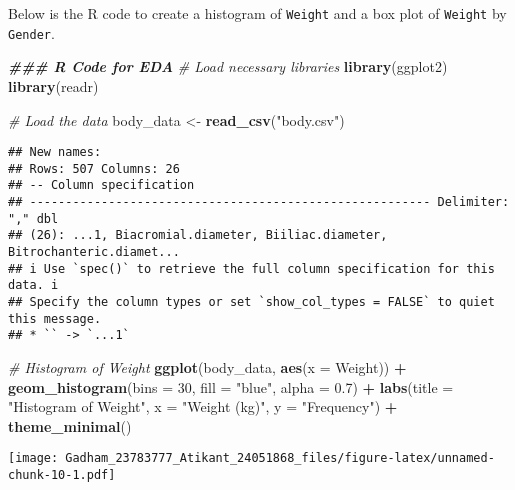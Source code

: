 \documentclass[
]{article}
\newenvironment{Shaded}{\begin{snugshade}}{\end{snugshade}}
\newcommand{\AttributeTok}[1]{\textcolor[rgb]{0.13,0.29,0.53}{#1}}
\newcommand{\CommentTok}[1]{\textcolor[rgb]{0.56,0.35,0.01}{\textit{#1}}}
\newcommand{\DecValTok}[1]{\textcolor[rgb]{0.00,0.00,0.81}{#1}}
\newcommand{\DocumentationTok}[1]{\textcolor[rgb]{0.56,0.35,0.01}{\textbf{\textit{#1}}}}
\newcommand{\FloatTok}[1]{\textcolor[rgb]{0.00,0.00,0.81}{#1}}
\newcommand{\FunctionTok}[1]{\textcolor[rgb]{0.13,0.29,0.53}{\textbf{#1}}}
\newcommand{\NormalTok}[1]{#1}
\newcommand{\OtherTok}[1]{\textcolor[rgb]{0.56,0.35,0.01}{#1}}
\newcommand{\SpecialCharTok}[1]{\textcolor[rgb]{0.81,0.36,0.00}{\textbf{#1}}}
\newcommand{\StringTok}[1]{\textcolor[rgb]{0.31,0.60,0.02}{#1}}
\begin{document}
Below is the R code to create a histogram of \texttt{Weight} and a box
plot of \texttt{Weight} by \texttt{Gender}.

\begin{Shaded}
\begin{Highlighting}[]
\DocumentationTok{\#\#\# R Code for EDA}
\CommentTok{\# Load necessary libraries}
\FunctionTok{library}\NormalTok{(ggplot2)}
\FunctionTok{library}\NormalTok{(readr)}

\CommentTok{\# Load the data}
\NormalTok{body\_data }\OtherTok{\textless{}{-}} \FunctionTok{read\_csv}\NormalTok{(}\StringTok{"body.csv"}\NormalTok{)}
\end{Highlighting}
\end{Shaded}

\begin{verbatim}
## New names:
## Rows: 507 Columns: 26
## -- Column specification
## -------------------------------------------------------- Delimiter: "," dbl
## (26): ...1, Biacromial.diameter, Biiliac.diameter, Bitrochanteric.diamet...
## i Use `spec()` to retrieve the full column specification for this data. i
## Specify the column types or set `show_col_types = FALSE` to quiet this message.
## * `` -> `...1`
\end{verbatim}

\begin{Shaded}
\begin{Highlighting}[]
\CommentTok{\# Histogram of Weight}
\FunctionTok{ggplot}\NormalTok{(body\_data, }\FunctionTok{aes}\NormalTok{(}\AttributeTok{x =}\NormalTok{ Weight)) }\SpecialCharTok{+}
  \FunctionTok{geom\_histogram}\NormalTok{(}\AttributeTok{bins =} \DecValTok{30}\NormalTok{, }\AttributeTok{fill =} \StringTok{"blue"}\NormalTok{, }\AttributeTok{alpha =} \FloatTok{0.7}\NormalTok{) }\SpecialCharTok{+}
  \FunctionTok{labs}\NormalTok{(}\AttributeTok{title =} \StringTok{"Histogram of Weight"}\NormalTok{, }\AttributeTok{x =} \StringTok{"Weight (kg)"}\NormalTok{, }\AttributeTok{y =} \StringTok{"Frequency"}\NormalTok{) }\SpecialCharTok{+}
  \FunctionTok{theme\_minimal}\NormalTok{()}
\end{Highlighting}
\end{Shaded}

\texttt{[image: Gadham\_23783777\_Atikant\_24051868\_files/figure-latex/unnamed-chunk-10-1.pdf]}
\end{document}
